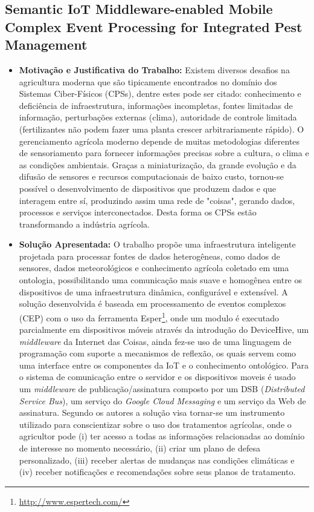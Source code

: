 \documentclass[tid,table]{texufpel} %
\begin{document}
\subsection{Semantic IoT Middleware-enabled Mobile Complex Event Processing for Integrated Pest Management}

\begin{itemize}
	\item \textbf{Motivação e Justificativa do Trabalho:} Existem diversos desafios na agricultura moderna que são tipicamente encontrados no domínio dos Sistemas Ciber-Físicos (CPSs), dentre estes pode ser citado: conhecimento e deficiência de infraestrutura, informações incompletas, fontes limitadas de informação, perturbações externas (clima), autoridade de controle limitada (fertilizantes não podem fazer uma planta crescer arbitrariamente rápido). O gerenciamento agrícola moderno depende  de muitas metodologias diferentes de sensoriamento para fornecer informações precisas sobre a cultura, o clima e as condições ambientais. Graças a miniaturização, da grande evolução e da difusão de sensores e recursos computacionais de baixo custo, tornou-se possível o desenvolvimento de dispositivos que produzem dados e que interagem entre sí, produzindo assim uma rede de "coisas", gerando dados, processos e serviços interconectados. Desta forma os CPSs estão transformando a indústria agrícola.
	
	\item \textbf{Solução Apresentada:} O trabalho propõe uma infraestrutura inteligente projetada para processar fontes de dados heterogêneas, como dados de sensores, dados meteorológicos e conhecimento agrícola coletado em uma ontologia, possibilitando uma comunicação mais suave e homogênea entre os dispositivos de uma infraestrutura dinâmica, configurável e extensível. A solução desenvolvida é baseada em processamento de eventos complexos (CEP) com o uso da ferramenta Esper\footnote{\url{http://www.espertech.com/}}, onde um modulo é executado parcialmente em dispositivos móveis através da introdução do DeviceHive, um \textit{middleware} da Internet das Coisas, ainda fez-se uso de uma linguagem de programação com suporte a mecanismos de reflexão, os quais servem como uma interface entre os componentes da IoT e o conhecimento ontológico. Para o sistema de comunicação entre o servidor e os dispositivos moveis é usado um \textit{middleware} de publicação/assinatura composto por um DSB (\textit{Distributed Service Bus}), um serviço do \textit{Google Cloud Messaging} e um serviço da Web de assinatura. Segundo os autores a solução visa tornar-se um instrumento utilizado para conscientizar sobre o uso dos tratamentos agrícolas, onde o agricultor pode (i) ter acesso a todas as informações relacionadas ao domínio de interesse no momento necessário, (ii) criar um plano de defesa personalizado, (iii) receber alertas de mudanças nas condições climáticas e (iv) receber notificações e recomendações sobre seus planos de tratamento.


\end{itemize}
\end{document}
